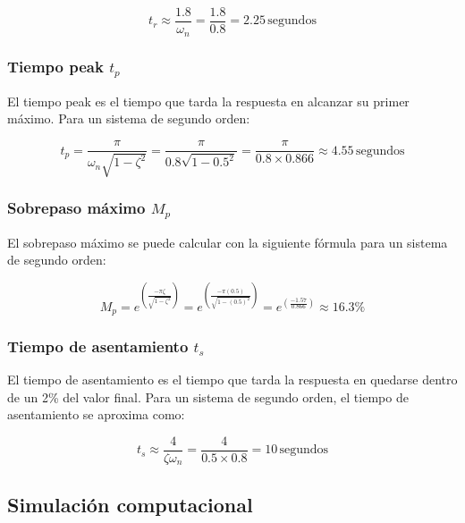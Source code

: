 \documentclass[10pt]{article}
\theoremstyle{definition}
\theoremstyle{remark}
\theoremstyle{definition}
\numberwithin{equation}{prob}
\begin{document}
\[
	t_r \approx \frac{1.8}{\omega_n} = \frac{1.8}{0.8} = 2.25 \, \text{segundos}
\]

\subsubsection{Tiempo peak \texorpdfstring{\(t_p\)}{tp}}

El tiempo peak es el tiempo que tarda la respuesta en alcanzar su primer máximo. Para un sistema de segundo orden:

\[
	t_p = \frac{\pi}{\omega_n \sqrt{1 - \zeta^2}} = \frac{\pi}{0.8 \sqrt{1 - 0.5^2}} = \frac{\pi}{0.8 \times 0.866} \approx 4.55 \, \text{segundos}
\]

\subsubsection{Sobrepaso máximo \texorpdfstring{\(M_p\)}{Mp}}

El sobrepaso máximo se puede calcular con la siguiente fórmula para un sistema de segundo orden:

\[
	M_p = e^{\left(\frac{-\pi \zeta}{\sqrt{1 - \zeta^2}}\right)} = e^{\left(\frac{-\pi (0.5)}{\sqrt{1 - (0.5)^2}}\right)} = e^{\left(\frac{-1.57}{0.866}\right)} \approx 16.3\%
\]

\subsubsection{Tiempo de asentamiento \texorpdfstring{\(t_s\)}{ts}}

El tiempo de asentamiento es el tiempo que tarda la respuesta en quedarse dentro de un 2\% del valor final. Para un sistema de segundo orden, el tiempo de asentamiento se aproxima como:

\[
	t_s \approx \frac{4}{\zeta \omega_n} = \frac{4}{0.5 \times 0.8} = 10 \, \text{segundos}
\]

\subsection{Simulación computacional}
\end{document}
